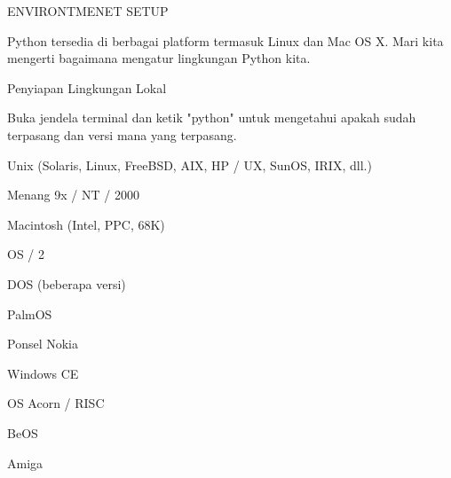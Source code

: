 
\sloppy
{\fontsize{14pt}{14pt}\selectfont ENVIRONTMENET SETUP \\} \par
\vspace{14pt}
\noindent 
{\fontsize{14pt}{14pt}\selectfont Python tersedia di berbagai platform termasuk Linux dan Mac OS X. Mari kita mengerti bagaimana mengatur lingkungan Python kita. \\} \par
\vspace{14pt}
\noindent 
{\fontsize{14pt}{14pt}\selectfont Penyiapan Lingkungan Lokal \\} \par
\noindent 
{\fontsize{14pt}{14pt}\selectfont Buka jendela terminal dan ketik "python" untuk mengetahui apakah sudah terpasang dan versi mana yang terpasang. \\} \par
\vspace{14pt}
\noindent 
{\fontsize{14pt}{14pt}\selectfont Unix (Solaris, Linux, FreeBSD, AIX, HP / UX, SunOS, IRIX, dll.) \\} \par
\noindent 
{\fontsize{14pt}{14pt}\selectfont Menang 9x / NT / 2000 \\} \par
\noindent 
{\fontsize{14pt}{14pt}\selectfont Macintosh (Intel, PPC, 68K) \\} \par
\noindent 
{\fontsize{14pt}{14pt}\selectfont OS / 2 \\} \par
\noindent 
{\fontsize{14pt}{14pt}\selectfont DOS (beberapa versi) \\} \par
\noindent 
{\fontsize{14pt}{14pt}\selectfont PalmOS \\} \par
\noindent 
{\fontsize{14pt}{14pt}\selectfont Ponsel Nokia \\} \par
\noindent 
{\fontsize{14pt}{14pt}\selectfont Windows CE \\} \par
\noindent 
{\fontsize{14pt}{14pt}\selectfont OS Acorn / RISC \\} \par
\noindent 
{\fontsize{14pt}{14pt}\selectfont BeOS \\} \par
\noindent 
{\fontsize{14pt}{14pt}\selectfont Amiga \\} \par
